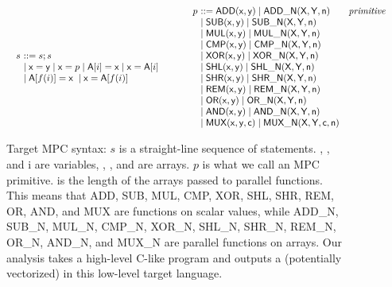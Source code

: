 
\begin{figure}
\small
\[
\begin{array}{l@{~~~~~}l}
  \begin{array}{l@{~}l@{~~~}l}
  s & ::= s ; s \\ 
  & \mid \x = \y  \mid \x = p \mid \A[i] = \x \mid \x = \A[i] \\
  & \mid \A[f(i)] = \x \; \mid \x = \A[f(i)] 
  \end{array}
\end{array}
\begin{array}{l@{~~~~~}l}
  \begin{array}{l@{~}l@{~~~}l}  
  p &  ::= {\sf ADD(x, y) \mid ADD\_N(X, Y, n)} & \mathit{primitive} \\ 
  & \mid {\sf SUB(x, y) \mid SUB\_N(X, Y, n)} &  \\ 
  & \mid {\sf MUL(x, y) \mid MUL\_N(X, Y, n)} &  \\ 
  & \mid {\sf CMP(x, y) \mid CMP\_N(X, Y, n)} &  \\ 
  & \mid {\sf XOR(x, y) \mid XOR\_N(X, Y, n)} &  \\ 
  & \mid {\sf SHL(x, y) \mid SHL\_N(X, Y, n)} &  \\ 
  & \mid {\sf SHR(x, y) \mid SHR\_N(X, Y, n)} &  \\ 
  & \mid {\sf REM(x, y) \mid REM\_N(X, Y, n)} & \\ 
  & \mid {\sf OR(x, y)  \mid OR\_N(X, Y, n)} &  \\ 
  & \mid {\sf AND(x, y) \mid AND\_N(X, Y, n)} &  \\ 
  & \mid {\sf MUX(x, y, c) \mid MUX\_N(X, Y, c, n)} &  \\ 
  \end{array}
\end{array}
\]
\caption{Target MPC syntax: $s$ is a straight-line sequence of statements. 
\x, \y, and {\sf i} are variables, {\A}, \X, and \Y are arrays. $p$ is what we call an MPC primitive. 
\n is the length of the arrays passed to parallel functions. This means that
ADD, SUB, MUL, CMP, XOR, SHL, SHR, REM, OR, AND, and MUX are functions on scalar values, 
while ADD_N, SUB_N, MUL_N, CMP_N, XOR_N, SHL_N, SHR_N, REM_N, OR_N, AND_N, and MUX_N are parallel functions on arrays.
Our analysis takes a high-level C-like program and outputs a (potentially vectorized) in this low-level target language.
}
\label{fig:muximpsyntax}
\end{figure}
